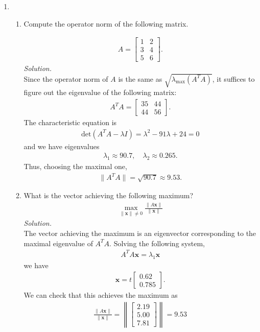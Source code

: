 \documentclass{article}
\begin{document}
\begin{enumerate}
\item 	
\begin{enumerate}
\item
Compute the operator norm of the following matrix.
	
	\begin{align*}
	A=\left[\begin{array}{ll}1 &2\\3&4\\5&6\end{array}\right].	
	\end{align*}
\emph{Solution.}\\
Since the operator norm of $A$ is the same as $\sqrt{\lambda_{\text{max}}(A^TA)}$, it suffices to figure out the eigenvalue of the following matrix:
	\begin{align*}
	A^TA=\left[\begin{array}{ll} 35&44\\ 44&56\end{array}\right]	.
	\end{align*}
The characteristic equation is
	\begin{align*}
	\text{det}( A^TA-\lambda I)=\lambda^2-91\lambda+24=0
	\end{align*}
and we have eigenvalues
	\begin{align*}
	\lambda_1\approx 90.7,\quad\lambda_2\approx 0.265.	
	\end{align*}
	Thus, choosing the maximal one,
	\begin{align*}
	\|A^TA\|=\sqrt{90.7}\approx 9.53.
	\end{align*}

\item What is the vector achieving the following maximum?
	\begin{align*}
	\max_{\|\mathbf{x}\|\neq 0} \frac{\|A\mathbf{x}\|}{\|\mathbf{x}\|}
	\end{align*}
\emph{Solution.}\\
The vector achieving the maximum is an eigenvector corresponding to the maximal eigenvalue of $A^TA$.
Solving the following system,
	\begin{align*}
	A^TA\mathbf{x}=\lambda_1\mathbf{x}
	\end{align*}
we have 
	\begin{align*}
	\mathbf{x}=t\left[\begin{array}{l} 0.62\\0.785\end{array}\right]	.
	\end{align*}
We can check that this achieves the maximum as
	\begin{align*}
	\frac{\|A\mathbf{x}\|}{\|\mathbf{x}\|}=\left\|\left[\begin{array}{l} 2.19\\5.00\\7.81\end{array}\right]\right\|=9.53
	\end{align*}


\end{enumerate}
\end{enumerate}
\end{document}
